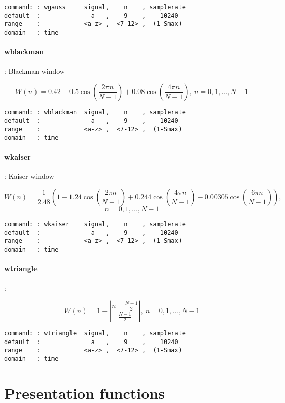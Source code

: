 \documentclass{report}
\newcommand{\bc}{\scriptsize}
\newcommand{\ec}{\normalsize}
\begin{document}
\bc
\begin{verbatim}
command: : wgauss     signal,    n    , samplerate
default  :              a   ,    9    ,    10240
range    :            <a-z> ,  <7-12> ,  (1-Smax)
domain   : time
\end{verbatim}
\ec

\paragraph{wblackman}: Blackman window

\[ W(n) = 0.42 - 0.5\cos (\frac{2\pi n}{N-1}) + 0.08\cos (\frac{4\pi n}{N-1}),~ n = 0,1,...,N-1 \]

\bc
\begin{verbatim}
command: : wblackman  signal,    n    , samplerate
default  :              a   ,    9    ,    10240
range    :            <a-z> ,  <7-12> ,  (1-Smax)
domain   : time
\end{verbatim}
\ec

\paragraph{wkaiser}: Kaiser window

\[ W(n) = \frac{1}{2.48} \left( 1- 1.24\cos (\frac{2\pi n}{N-1}) + 0.244\cos (\frac{4\pi n}{N-1}) - 0.00305\cos (\frac{6\pi n}{N-1}) \right),\]
\[ n = 0,1,...,N-1  \]


\bc
\begin{verbatim}
command: : wkaiser    signal,    n    , samplerate
default  :              a   ,    9    ,    10240
range    :            <a-z> ,  <7-12> ,  (1-Smax)
domain   : time
\end{verbatim}
\ec

\paragraph{wtriangle}:

\[ W(n) = 1 - \left|  \frac{n-\frac{N-1}{2}}{\frac{N-1}{2}} \right| ,~ n = 0,1,...,N-1 \]

\bc
\begin{verbatim}
command: : wtriangle  signal,    n    , samplerate
default  :              a   ,    9    ,    10240
range    :            <a-z> ,  <7-12> ,  (1-Smax)
domain   : time
\end{verbatim}
\ec

\section{Presentation functions}
\end{document}
